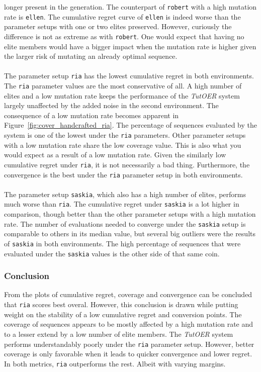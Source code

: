 longer present in the generation. The counterpart of \texttt{robert} with a high
mutation rate is \texttt{ellen}. The cumulative regret curve of \texttt{ellen}
is indeed worse than the parameter setups with one or two elites preserved.
However, curiously the difference is not as extreme as with \texttt{robert}.
One would expect that having no elite members would have a bigger impact when
the mutation rate is higher given the larger risk of mutating an already
optimal sequence.\\\\
\noindent
The parameter setup \texttt{ria} has the lowest cumulative regret in both
environments. The \texttt{ria} parameter values are the most conservative of
all. A high number of elites and a low mutation rate keeps the performance of
the \emph{TutOER} system largely unaffected by the added noise in the second
environment. The consequence of a low mutation rate becomes apparent in
Figure~\ref{fig:cover_handcrafted_ria}. The percentage of sequences evaluated by
the system is one of the lowest under the \texttt{ria} parameters.
Other parameter setups with a low mutation rate share the low coverage value.
This is also what you would expect as a result of a low mutation rate. Given
the similarly low cumulative regret under \texttt{ria}, it is not necessarily a
bad thing. Furthermore, the convergence is the best under the \texttt{ria}
parameter setup in both environments.\\\\
\noindent
The parameter setup \texttt{saskia}, which also has a high number of elites,
performs much worse than \texttt{ria}. The cumulative regret under
\texttt{saskia} is a lot higher in comparison, though better than the other
parameter setups with a high mutation rate. The number of evaluations needed to
converge under the \texttt{saskia} setup is comparable to others in its median
value, but several big outliers were the results of \texttt{saskia} in both
environments. The high percentage of sequences that were evaluated under the
\texttt{saskia} values is the other side of that same coin.
\subsubsection*{Conclusion}
From the plots of cumulative regret, coverage and convergence can
be concluded that \texttt{ria} scores best overal. However, this conclusion is
drawn while putting weight on the stability of a low cumulative regret and
conversion points. The coverage of sequences appears to be mostly affected by
a high mutation rate and to a lesser extend by a low number of elite members.
The \emph{TutOER} system performs understandably poorly under the \texttt{ria}
parameter setup. However, better coverage is only favorable when it leads to quicker
convergence and lower regret. In both metrics, \texttt{ria} outperforms the
rest. Albeit with varying margins.

